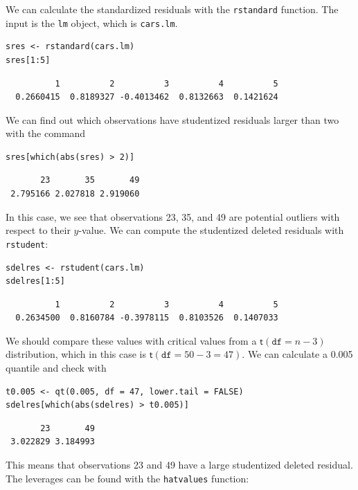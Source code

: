 \documentclass[captions=tableheading]{scrbook}
\begin{document}
We can calculate the standardized residuals with the \texttt{rstandard} function. The input is the \texttt{lm} object, which is \texttt{cars.lm}.


\begin{verbatim}
sres <- rstandard(cars.lm)
sres[1:5]
\end{verbatim}

\begin{verbatim}
          1          2          3          4          5 
  0.2660415  0.8189327 -0.4013462  0.8132663  0.1421624
\end{verbatim}

We can find out which observations have studentized residuals larger than two with the command


\begin{verbatim}
sres[which(abs(sres) > 2)]
\end{verbatim}

\begin{verbatim}
       23       35       49 
 2.795166 2.027818 2.919060
\end{verbatim}

In this case, we see that observations 23, 35, and 49 are potential outliers with respect to their \(y\)-value.  We can compute the studentized deleted residuals with \texttt{rstudent}:


\begin{verbatim}
sdelres <- rstudent(cars.lm)
sdelres[1:5]
\end{verbatim}

\begin{verbatim}
          1          2          3          4          5 
  0.2634500  0.8160784 -0.3978115  0.8103526  0.1407033
\end{verbatim}

We should compare these values with critical values from a \(\mathsf{t}(\mathtt{df}=n-3)\) distribution, which in this case is \(\mathsf{t}(\mathtt{df}=50-3=47)\). We can calculate a 0.005 quantile and check with 


\begin{verbatim}
t0.005 <- qt(0.005, df = 47, lower.tail = FALSE)
sdelres[which(abs(sdelres) > t0.005)]
\end{verbatim}

\begin{verbatim}
       23       49 
 3.022829 3.184993
\end{verbatim}

This means that observations 23 and 49 have a large studentized deleted residual. The leverages can be found with the \texttt{hatvalues} function:
\end{document}
